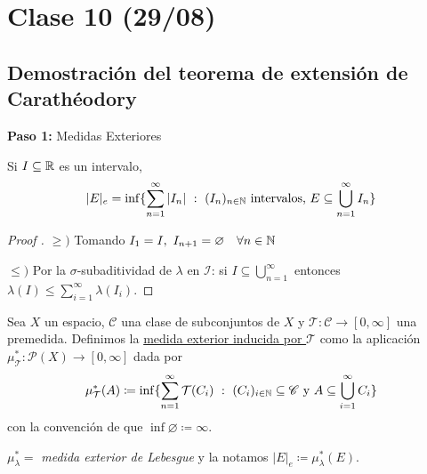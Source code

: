 \section{Clase 10 (29/08)}

\subsection*{Demostración del teorema de extensión de Carathéodory}

\textbf{Paso 1:} Medidas Exteriores

\begin{prop}
	Si $I \subseteq \mathbb{R}$ es un intervalo,
	\[ |E|_{e} = \inf \{ \sum_{n=1}^{\infty} |I_n| \ : \  (I_n)_{n\in\mathbb{N}} \text{ intervalos, } E \subseteq \bigcup_{n=1}^{\infty} I_n \} \]
\end{prop}
\begin{proof}[Proof ]
	$\geq)$ Tomando $I_1 = I,\ I_{n+1} = \varnothing \quad \forall n \in \mathbb{N}$ \newline

	$\leq)$ Por la $\sigma$-subaditividad de $\lambda$ en $\mathcal{I}$: si $I\subseteq \bigcup_{n=1}^{\infty}$ entonces $\lambda(I) \leq \sum_{i=1}^{\infty} \lambda(I_i)$.
\end{proof}

\begin{definition}
	Sea $X$ un espacio, $\mathscr{C}$ una clase de subconjuntos de $X$ y $\mathcal{T} : \mathscr{C} \to [0,\infty]$ una premedida. Definimos la \underline{medida exterior inducida por $\mathcal{T}$} como la aplicación $\mu_{\mathcal{T}}^{*} : \mathscr{P}(X) \to [0,\infty]$ dada por
	\[ \mu_{\mathcal{T}}^{*}(A) \coloneq \inf \{ \sum_{n=1}^{\infty} \mathcal{T}(C_i) \ : \ (C_i)_{i\in\mathbb{N}} \subseteq \mathscr{C} \text{ y } A \subseteq \bigcup_{i=1}^{\infty} C_i \} \]
	con la convención de que $\inf \varnothing \coloneq \infty$.
\end{definition}

\begin{eg}
	$\mu_{\lambda}^{*} =$ \textit{medida exterior de Lebesgue} y la notamos $|E|_e \coloneq \mu_{\lambda}^{*}(E)$.
\end{eg}

